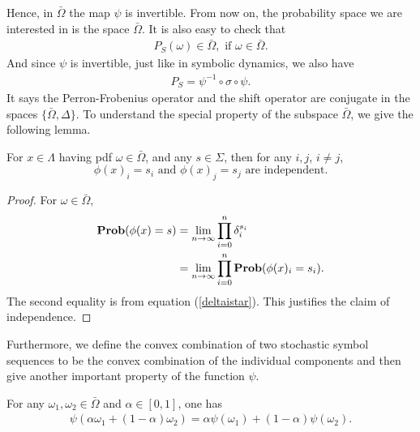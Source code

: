 Hence, in $\bar{\Omega}$ the map $\psi$ is invertible. From now on, the probability space we are interested in is the space $\bar{\Omega}$. It is also easy to check that
 \begin{eqnarray}
 \label{Pconserve}
  P_S (\omega) \in \bar{\Omega}, \mbox{ if } \omega \in \bar{\Omega}.
 \end{eqnarray}
And since $\psi$ is invertible, just like in symbolic dynamics, we also have
 \begin{eqnarray}
 P_S= \psi^{-1}\circ \sigma \circ \psi.
 \end{eqnarray}
It says the Perron-Frobenius operator and the shift operator are conjugate in the spaces $\{\bar{\Omega},\Delta \}$. To understand the special property of the subspace $\bar{\Omega}$, we give the following lemma.

\begin{lemma} \label{lemma:independency}
For $x \in \Lambda$ having pdf $\omega \in \bar{\Omega}$, and any $s\in \Sigma$, then for any $i,j$, $i\neq j$, 
\begin{equation}
   \phi(x)_i=s_i \mbox{ and } \phi(x)_j=s_j \mbox{ are independent.}
\end{equation}
\end{lemma}

\begin{proof} For $\omega\in \bar{\Omega}$, 
 \begin{align*}
   \operatorname{\mathbf{Prob}}(\phi(x)=s) &= \lim_{n \to \infty} \prod_{i=0}^{n} \delta_i^{s_i}  \\
                      &=  \lim_{n \to \infty} \prod_{i=0}^{n} \operatorname{\mathbf{Prob}}(\phi(x)_i=s_i).
 \end{align*}
The second equality is from equation (\ref{deltaistar}). This justifies the claim of independence.   
\end{proof}


Furthermore, we define the convex combination of two stochastic symbol sequences to be the convex combination of the individual components and then give another important property of the function $\psi$.
\begin{lemma}
For any $\omega_1, \omega_2 \in \bar{\Omega}$ and $\alpha\in[0,1]$, one has
 \begin{eqnarray}
 \label{psiislinear}
  \psi(\alpha\omega_1+(1-\alpha)\omega_2) = \alpha\psi(\omega_1)+(1-\alpha)\psi(\omega_2).
 \end{eqnarray}
\end{lemma}

